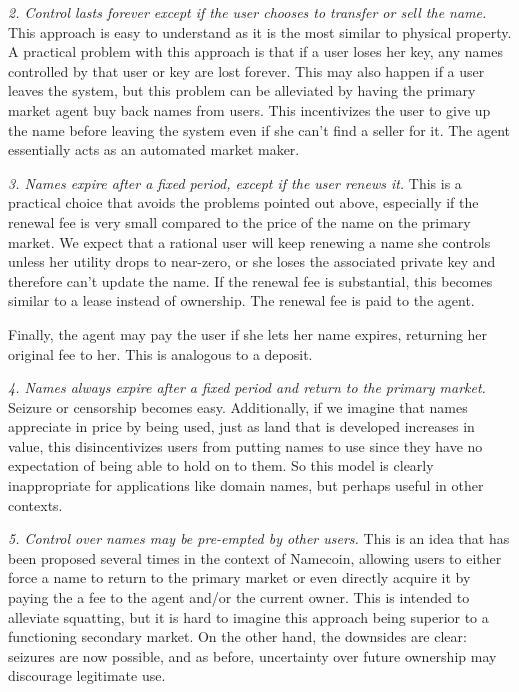{\em 2. Control lasts forever except if the user chooses to transfer or sell the name.} This approach is easy to understand as it is the most similar to physical property. A practical problem with this approach is that if a user loses her key, any names controlled by that user or key are lost forever. This may also happen if a user leaves the system, but this problem can be alleviated by having the primary market agent buy back names from users. This incentivizes the user to give up the name before leaving the system even if she can't find a seller for it. The agent essentially acts as an automated market maker.

{\em 3. Names expire after a fixed period, except if the user renews it.} This is a practical choice that avoids the problems pointed out above, especially if the renewal fee is very small compared to the price of the name on the primary market. We expect that a rational user will keep renewing a name she controls unless her utility drops to near-zero, or she loses the associated private key and therefore can't update the name. If the renewal fee is substantial, this becomes similar to a lease instead of ownership. The renewal fee is paid to the agent. 

Finally, the agent may pay the user if she lets her name expires, returning her original fee to her. This is analogous to a deposit.

{\em 4. Names always expire after a fixed period and return to the primary market.} 
Seizure or censorship becomes easy. Additionally, if we imagine that names appreciate in price by being used, just as land that is developed increases in value, this disincentivizes users from putting names to use since they have no expectation of being able to hold on to them. 
So this model is clearly inappropriate for applications like domain names, but perhaps useful in other contexts. 


{\em 5. Control over names may be pre-empted by other users.} 
This is an idea that has been proposed  several times in the context of Namecoin, allowing users to either force a name to return to the primary market or even directly acquire it by paying the a fee to the agent and/or the current owner. This is intended to alleviate squatting, but it is hard to imagine this approach being superior to a functioning secondary market. On the other hand, the downsides are clear: seizures are now possible, and as before, uncertainty over future ownership may discourage legitimate use.

